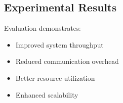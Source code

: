 \subsection{Experimental Results}
Evaluation demonstrates:
\begin{itemize}
    \item Improved system throughput
    \item Reduced communication overhead
    \item Better resource utilization
    \item Enhanced scalability
\end{itemize} 